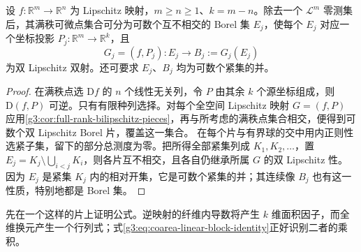 \begin{lemma}\label{g3:lem:coarea-regular-pieces}
	设 \(f:\mathbb R^m\to\mathbb R^n\) 为 Lipschitz 映射，\(m\ge n\ge1\)、\(k=m-n\)。除去一个 \(\mathcal L^m\) 零测集后，其满秩可微点集合可分为可数个互不相交的 Borel 集 \(E_j\)，使每个 \(E_j\) 对应一个坐标投影 \(P_j:\mathbb R^m\to\mathbb R^k\)，且
	\[
		G_j=(f,P_j):E_j\longrightarrow B_j:=G_j(E_j)
	\]
	为双 Lipschitz 双射。还可要求 \(E_j\)、\(B_j\) 均为可数个紧集的并。
\end{lemma}
\begin{proof}
	在满秩点选 \(\mathrm Df\) 的 \(n\) 个线性无关列，令 \(P\) 由其余 \(k\) 个源坐标组成，则 \(\mathrm D(f,P)\) 可逆。只有有限种列选择。对每个全空间 Lipschitz 映射 \(G=(f,P)\) 应用\cref{g3:cor:full-rank-bilipschitz-pieces}，再与所考虑的满秩点集合相交，便得到可数个双 Lipschitz Borel 片，覆盖这一集合。
	在每个片与有界球的交中用内正则性选紧子集，留下的部分总测度为零。把所得全部紧集列成 \(K_1,K_2,\ldots\)，置 \(E_j=K_j\setminus\bigcup_{i<j}K_i\)，则各片互不相交，且各自仍继承所属 \(G\) 的双 Lipschitz 性。因为 \(E_j\) 是紧集 \(K_j\) 内的相对开集，它是可数个紧集的并；其连续像 \(B_j\) 也有这一性质，特别地都是 Borel 集。
\end{proof}

先在一个这样的片上证明公式。逆映射的纤维内导数将产生 \(k\) 维面积因子，而全维换元产生一个行列式；式\eqref{g3:eq:coarea-linear-block-identity}正好识别二者的乘积。

